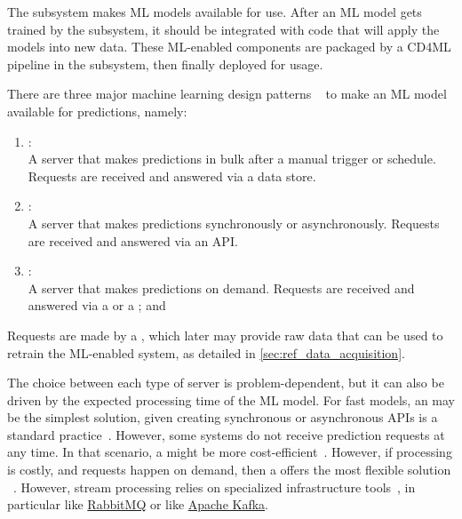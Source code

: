   The  subsystem makes ML models available for use.
  After an ML model gets trained by the  
  subsystem, it should be integrated with code that will apply the models
  into new data. These ML-enabled components are packaged by a CD4ML
  pipeline in the  subsystem,
  then finally deployed for usage.

  There are three major machine learning design patterns%
  ~\parencite{Lakshmanan2020MachineMLOps} to make an ML model available
  for predictions, namely:
  \begin{enumerate}
    \item {}: \\
          A server that makes predictions in bulk after a manual
          trigger or schedule.
          Requests are received and answered via a data store.
    \item {}: \\
          A server that makes predictions synchronously or asynchronously.
          Requests are received and answered via an API.
    \item {}: \\
          A server that makes predictions on demand.
          Requests are received and answered via
          a  or
          a ; and
  \end{enumerate}
  Requests are made by a , which
  later may provide raw data that can be used to retrain the ML-enabled
  system, as detailed in \cref{sec:ref_data_acquisition}.

  The choice between each type of server is problem-dependent, but it can
  also be driven by the expected processing time of the ML model.
  For fast models, an  may be the
  simplest solution, given creating synchronous or asynchronous APIs
  is a standard practice~\parencite{Richardson2018MicroservicesPatterns}.
  However, some systems do not receive prediction requests at any time.
  In that scenario, a 
  might be more cost-efficient~\parencite{Kleppmann2017DesigningSystems,
  Reis2022FundamentalsSystems}. However, if processing is costly, and
  requests happen on demand, then a  offers the most flexible solution%
  ~\parencite{Boner2016ReactiveSystems,Smith2018MachineScale}.
  However, stream processing relies on specialized infrastructure
  tools~\parencite{Boner2016ReactiveSystems,Wampler2016FastApplications},
  in particular
    like \href{https://www.rabbitmq.com/}{RabbitMQ} or
    like \href{https://kafka.apache.org/}{Apache Kafka}.

